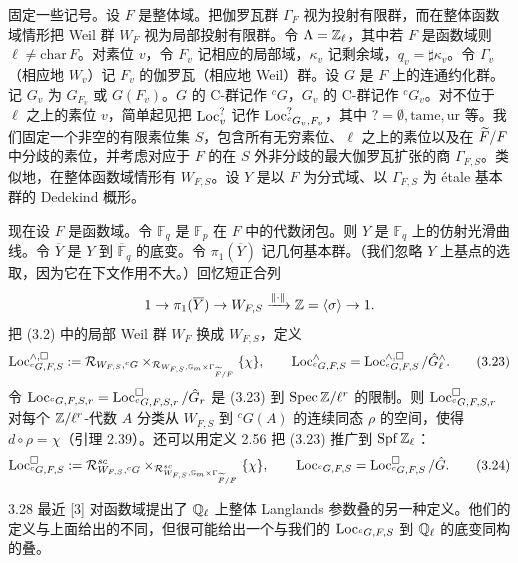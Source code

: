 固定一些记号。设 $F$ 是整体域。把伽罗瓦群 $\Gamma_F$ 视为投射有限群，而在整体函数域情形把 Weil 群 $W_F$ 视为局部投射有限群。令 $\Lambda=\mathbb{Z}_{\ell}$，其中若 $F$ 是函数域则 $\ell\neq\mathrm{char}\,F$。对素位 $v$，令 $F_v$ 记相应的局部域，$\kappa_v$ 记剩余域，$q_v=\sharp\kappa_v$。令 $\Gamma_v$（相应地 $W_v$）记 $F_v$ 的伽罗瓦（相应地 Weil）群。设 $G$ 是 $F$ 上的连通约化群。记 $G_v$ 为 $G_{F_v}$ 或 $G(F_v)$。$G$ 的 C-群记作 ${}^cG$，$G_v$ 的 C-群记作 ${}^cG_v$。对不位于 $\ell$ 之上的素位 $v$，简单起见把 $\operatorname{Loc}^{?}_{v}$ 记作 $\operatorname{Loc}^{?}_{{}^{c}G_v,F_v}$，其中 $?=\emptyset,\mathrm{tame},\mathrm{ur}$ 等。我们固定一个非空的有限素位集 $S$，包含所有无穷素位、$\ell$ 之上的素位以及在 $\widetilde F/F$ 中分歧的素位，并考虑对应于 $F$ 的在 $S$ 外非分歧的最大伽罗瓦扩张的商 $\Gamma_{F,S}$。类似地，在整体函数域情形有 $W_{F,S}$。设 $Y$ 是以 $F$ 为分式域、以 $\Gamma_{F,S}$ 为 étale 基本群的 Dedekind 概形。

现在设 $F$ 是函数域。令 $\mathbb F_q$ 是 $\mathbb F_p$ 在 $F$ 中的代数闭包。则 $Y$ 是 $\mathbb F_q$ 上的仿射光滑曲线。令 $\overline Y$ 是 $Y$ 到 $\overline{\mathbb F}_q$ 的底变。令 $\pi_1(\overline Y)$ 记几何基本群。（我们忽略 $Y$ 上基点的选取，因为它在下文作用不大。）回忆短正合列
\[
1\to\pi_1(\overline Y)\to W_{F,S}\xrightarrow{\|\cdot\|}\mathbb{Z}=\langle\sigma\rangle\to1.
\]
把 (3.2) 中的局部 Weil 群 $W_F$ 换成 $W_{F,S}$，定义
\begin{equation}
\operatorname{Loc}^{\wedge,\square}_{{}^{c}G,F,S}:=\mathcal R_{W_{F,S},{}^{c}G}\times_{\mathcal R_{W_{F,S},\mathbb G_m\times\Gamma_{\widetilde F/F}}}\{\chi\},\qquad
\operatorname{Loc}^{\wedge}_{{}^{c}G,F,S}=\operatorname{Loc}^{\wedge,\square}_{{}^{c}G,F,S}/\hat G^{\wedge}_{\ell}. \tag{3.23}
\end{equation}
令 $\operatorname{Loc}_{{}^{c}G,F,S,r}=\operatorname{Loc}^{\square}_{{}^{c}G,F,S,r}/\hat G_r$ 是 (3.23) 到 $\operatorname{Spec}\mathbb{Z}/\ell^{r}$ 的限制。则 $\operatorname{Loc}^{\square}_{{}^{c}G,F,S,r}$ 对每个 $\mathbb{Z}/\ell^{r}$-代数 $A$ 分类从 $W_{F,S}$ 到 ${}^cG(A)$ 的连续同态 $\rho$ 的空间，使得 $d\circ\rho=\chi$（引理 2.39）。还可以用定义 2.56 把 (3.23) 推广到 $\operatorname{Spf}\mathbb{Z}_{\ell}$：
\begin{equation}
\operatorname{Loc}^{\square}_{{}^{c}G,F,S}:=\mathcal R^{sc}_{W_{F,S},{}^{c}G}\times_{\mathcal R^{sc}_{W_{F,S},\mathbb G_m\times\Gamma_{\widetilde F/F}}}\{\chi\},\qquad
\operatorname{Loc}_{{}^{c}G,F,S}=\operatorname{Loc}^{\square}_{{}^{c}G,F,S}/\hat G. \tag{3.24}
\end{equation}
\begin{rem}{3.28}
最近 [3] 对函数域提出了 $\mathbb{Q}_{\ell}$ 上整体 Langlands 参数叠的另一种定义。他们的定义与上面给出的不同，但很可能给出一个与我们的 $\operatorname{Loc}_{{}^{c}G,F,S}$ 到 $\mathbb{Q}_{\ell}$ 的底变同构的叠。
\end{rem}

